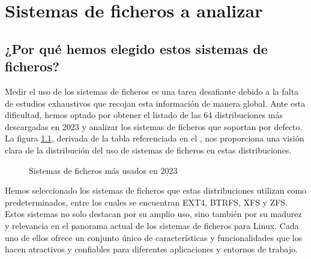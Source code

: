 \chapter{Sistemas de ficheros a analizar}\label{sec:capítulo_3}

\section{¿Por qué hemos elegido estos sistemas de ficheros?}

Medir el uso de los sistemas de ficheros es una tarea desafiante debido a la falta de estudios exhaustivos que recojan esta información de manera global. Ante esta dificultad, hemos optado por obtener el listado de las 64 distribuciones más descargadas en 2023 y analizar los sistemas de ficheros que soportan por defecto. La figura \ref{fig:uso sistemas de ficheros}, derivada de la tabla referenciada en el , nos proporciona una visión clara de la distribución del uso de sistemas de ficheros en estas distribuciones.

\begin{figure}[htbp]
    \centering
    \caption{Sistemas de ficheros más usados en 2023}
    \label{fig:uso sistemas de ficheros}
\end{figure}

Hemos seleccionado los sistemas de ficheros que estas distribuciones utilizan como predeterminados, entre los cuales se encuentran EXT4, BTRFS, XFS y ZFS. Estos sistemas no solo destacan por su amplio uso, sino también por su madurez y relevancia en el panorama actual de los sistemas de ficheros para Linux. Cada uno de ellos ofrece un conjunto único de características y funcionalidades que los hacen atractivos y confiables para diferentes aplicaciones y entornos de trabajo.

